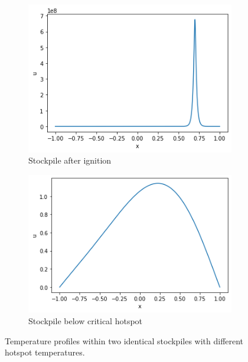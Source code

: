 \begin{figure}[h!]
\centering
\begin{subfigure}{.5\textwidth}
  \centering
  \includegraphics[width=\linewidth]{figures/NDA/Hotspot/Sample_inert.png}  
  \caption{Stockpile after ignition}
  \label{fig:hot:ignited_inert}
\end{subfigure}%
\begin{subfigure}{.5\textwidth}
  \centering
  \includegraphics[width=\linewidth]{figures/NDA/Hotspot/Sample_sub_inert.png}  
  \caption{Stockpile below critical hotspot}
  \label{fig:hot:sub_inert}
\end{subfigure}
\caption{Temperature profiles within two identical stockpiles with different hotspot temperatures.}
\label{fig:hot:sample_inert}
\end{figure}

